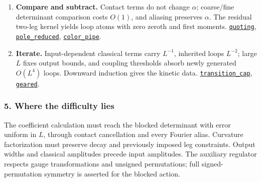 \documentclass[
  letterpaper,
  11pt]{article}
\begin{document}
\begin{enumerate}
  \href{https://github.com/yang-mills-group/OpenAI-YM-20261028/blob/3456e5e75cf8d4cd558955a5c7638fba2d68f464/YM/Next/STATIONARY/OneLoop/MomentumIntegral.lean\#L326-L338}{\texttt{poleSpin}},
  \href{https://github.com/yang-mills-group/OpenAI-YM-20261028/blob/3456e5e75cf8d4cd558955a5c7638fba2d68f464/YM/Next/STATIONARY/OneLoop/MomentumIntegral.lean\#L346-L408}{\texttt{absoluteGeode}}.
\item
  \textbf{Compare and subtract.} Contact terms do not change \(\alpha\);
  coarse/fine determinant comparison costs \(O(1)\), and aliasing
  preserves \(\alpha\). The residual two-leg kernel yields loop atoms
  with zero zeroth and first moments.
  \href{https://github.com/yang-mills-group/OpenAI-YM-20261028/blob/3456e5e75cf8d4cd558955a5c7638fba2d68f464/YM/Next/STATIONARY/Loops/HessianMatch.lean\#L67-L96}{\texttt{quoting}},
  \href{https://github.com/yang-mills-group/OpenAI-YM-20261028/blob/3456e5e75cf8d4cd558955a5c7638fba2d68f464/YM/Next/STATIONARY/Loops/HessianMatch.lean\#L719-L741}{\texttt{pole\_reduced}},
  \href{https://github.com/yang-mills-group/OpenAI-YM-20261028/blob/3456e5e75cf8d4cd558955a5c7638fba2d68f464/YM/Next/STATIONARY/Loops/Curvature.lean\#L394-L435}{\texttt{color\_pipe}}.
\item
  \textbf{Iterate.} Input-dependent classical terms carry \(L^{-1}\),
  inherited loops \(L^{-2}\); large \(L\) fixes output bounds, and
  coupling thresholds absorb newly generated \(O(L^4)\) loops. Downward
  induction gives the kinetic data.
  \href{https://github.com/yang-mills-group/OpenAI-YM-20261028/blob/3456e5e75cf8d4cd558955a5c7638fba2d68f464/YM/Next/STATIONARY/Level/Transition.lean\#L92-L182}{\texttt{transition\_cap}},
  \href{https://github.com/yang-mills-group/OpenAI-YM-20261028/blob/3456e5e75cf8d4cd558955a5c7638fba2d68f464/YM/Next/STATIONARY/FullPlanned.lean\#L59-L66}{\texttt{geared}}.
\end{enumerate}

\subsubsection{5. Where the difficulty
lies}\label{where-the-difficulty-lies-9}

The coefficient calculation must reach the blocked determinant with
error uniform in \(L\), through contact cancellation and every Fourier
alias. Curvature factorization must preserve decay and previously
imposed leg constraints. Output widths and classical amplitudes precede
input amplitudes. The auxiliary regulator respects gauge transformations
and unsigned permutations; full signed-permutation symmetry is asserted
for the blocked action.
\end{document}
